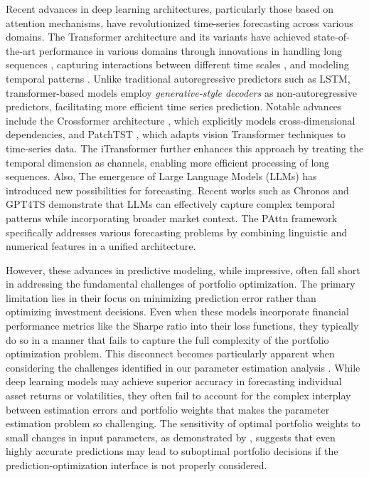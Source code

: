 Recent advances in deep learning architectures, particularly those based on attention mechanisms, have revolutionized time-series forecasting across various domains. The Transformer architecture and its variants have achieved state-of-the-art performance in various domains through innovations in handling long sequences \citep{informer_2021}, capturing interactions between different time scales \citep{zhou2022fedformer}, and modeling temporal patterns \citep{wu2023timesnet}. Unlike traditional autoregressive predictors such as LSTM, transformer-based models employ \textit{generative-style decoders} as non-autoregressive predictors, facilitating more efficient time series prediction. Notable advances include the Crossformer architecture \citep{zhang2023crossformer}, which explicitly models cross-dimensional dependencies, and PatchTST \citep{Yuqietal_PatchTST}, which adapts vision Transformer techniques to time-series data. The iTransformer \citep{liu2023itransformer} further enhances this approach by treating the temporal dimension as channels, enabling more efficient processing of long sequences. Also, The emergence of Large Language Models (LLMs) has introduced new possibilities for forecasting. Recent works such as Chronos \citep{ansari2024chronos} and GPT4TS \citep{zhou2023one} demonstrate that LLMs can effectively capture complex temporal patterns while incorporating broader market context. The PAttn framework \citep{tan2024language} specifically addresses various forecasting problems by combining linguistic and numerical features in a unified architecture.

However, these advances in predictive modeling, while impressive, often fall short in addressing the fundamental challenges of portfolio optimization. The primary limitation lies in their focus on minimizing prediction error rather than optimizing investment decisions. Even when these models incorporate financial performance metrics like the Sharpe ratio into their loss functions, they typically do so in a manner that fails to capture the full complexity of the portfolio optimization problem. This disconnect becomes particularly apparent when considering the challenges identified in our parameter estimation analysis \citep{hwang2024temporal}. While deep learning models may achieve superior accuracy in forecasting individual asset returns or volatilities, they often fail to account for the complex interplay between estimation errors and portfolio weights that makes the parameter estimation problem so challenging. The sensitivity of optimal portfolio weights to small changes in input parameters, as demonstrated by \citep{chopra1993effect}, suggests that even highly accurate predictions may lead to suboptimal portfolio decisions if the prediction-optimization interface is not properly considered. 

